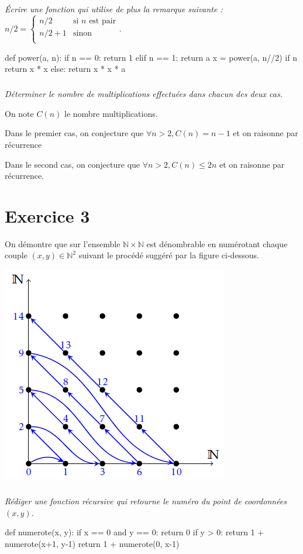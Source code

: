 \documentclass[10pt,fleqn]{book} %
\begin{document}
\begin{multicols}{2}
\subparagraph{}
\textit{Écrire une fonction qui utilise de plus la remarque suivante :}
$n/2 = \left\{ 
\begin{array}{ll} 
n/2 & \text{si }n \text{ est pair} \\
n/2+1 & \text{sinon}\\
\end{array}
\right.
$.
\ifprof
\begin{corrige}
\begin{python}
def power(a, n):
    if n == 0:
        return 1
    elif n == 1:
        return a
    x = power(a, n//2)
    if n %
        return x * x
    else:
        return x * x * a
\end{python}
\end{corrige}
\else
\fi


\subparagraph{}
\textit{Déterminer le nombre de multiplications effectuées dans chacun des deux cas.}
\ifprof
\begin{corrige}
On note $C(n)$ le nombre multiplications.

Dans le premier cas, on conjecture que $\forall n>2, C(n)=n-1$ et on raisonne par récurrence

Dans le second cas, on conjecture que $\forall n>2, C(n)\leq 2n$ et on raisonne par récurrence.
\end{corrige}
\else
\fi


\section*{Exercice 3}
\setcounter{subparagraph}{0}
On démontre que sur l'ensemble $\mathbb{N}\times \mathbb{N}$ est dénombrable en numérotant chaque couple $(x,y)\in\mathbb{N}^2$ suivant le procédé suggéré par la figure ci-dessous.
\begin{center}
\includegraphics[width=.45\linewidth]{images/fig_01}
\end{center}

\subparagraph{}\textit{Rédiger une fonction récursive qui retourne le numéro du point de coordonnées $(x,y)$.}
\ifprof
\begin{corrige}
\begin{python}
def numerote(x, y):
    if x == 0 and y == 0:
        return 0
    if y > 0:
        return 1 + numerote(x+1, y-1)
    return 1 + numerote(0, x-1)
\end{python}
\end{corrige}
\else
\fi


\end{multicols}
\end{document}
